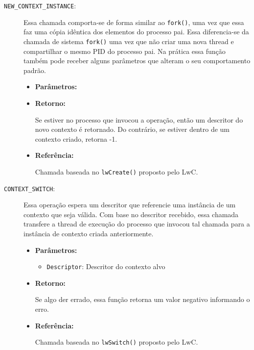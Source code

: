 \begin{description}
  \item [\texttt{NEW\_CONTEXT\_INSTANCE}:]

Essa chamada comporta-se de forma similar ao \texttt{fork()}, uma vez que essa
faz uma cópia idêntica dos elementos do processo pai. Essa diferencia-se da
chamada de sistema \texttt{fork()} uma vez que não criar uma nova thread e
compartilhar o mesmo PID do processo pai. Na prática essa função também pode
receber alguns parâmetros que alteram o seu comportamento padrão.

  \begin{itemize}
    \item \textbf{Parâmetros:}

    \item \textbf{Retorno:}

Se estiver no processo que invocou a operação, então um descritor do novo
contexto é retornado. Do contrário, se estiver dentro de um contexto criado,
retorna -1.

    \item \textbf{Referência:}

Chamada baseada no \texttt{lwCreate()} proposto pelo LwC.

  \end{itemize}

  \item [\texttt{CONTEXT\_SWITCH}:]

Essa operação espera um descritor que referencie uma instância de um contexto
que seja válida. Com base no descritor recebido, essa chamada transfere a
thread de execução do processo que invocou tal chamada para a instância de
contexto criada anteriormente.

  \begin{itemize}
    \item \textbf{Parâmetros:}

    \begin{itemize}
      \item \texttt{Descriptor}: Descritor do contexto alvo
    \end{itemize}

    \item \textbf{Retorno:}

Se algo der errado, essa função retorna um valor negativo informando o erro.

    \item \textbf{Referência:}

Chamada baseada no \texttt{lwSwitch()} proposto pelo LwC.


\end{itemize}
\end{description}
